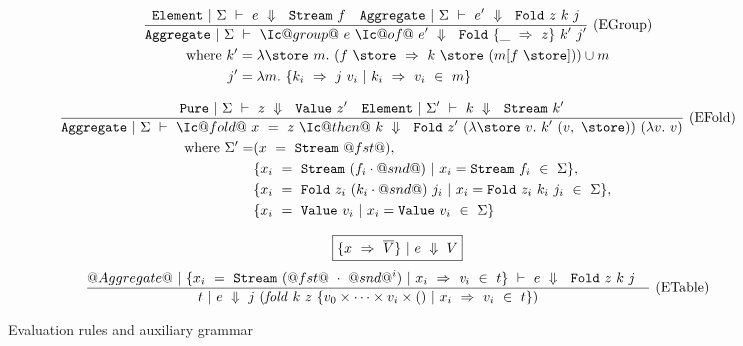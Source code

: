 \begin{figure*}
\begin{gather*}
\ruleIN
{
  \SourceStepXE{\Sigma}{e}{\VStream{f}}
  \quad
  \SourceStepXA{\Sigma}{e'}{\VFold{z}{k}{j}}
}
{
  \SourceStepXA{\Sigma}
    {\Ic@group@~e~\Ic@of@~e'}
    {\VFold
      {\{\_~\Rightarrow~z\}}
      {k'}
      {j'}}
}{EGroup}
\\
\begin{aligned}
\mbox{where }
k' & = \lam{\store~m}
(f~\store~\Rightarrow~k~\store~(m[f~\store])) \cup m
\\
j' & = \lam{m}
        \{k_i~\Rightarrow~j~v_i~|~k_i~\Rightarrow~v_i~\in~m\}
\end{aligned}
\end{gather*}

\begin{gather*}
\ruleIN
{
  \SourceStepXP{\Sigma}{z}{\VValue{z'}}
  \quad
  \SourceStepXE{\Sigma'}{k}{\VStream{k'}}
}
{
  \SourceStepXA{\Sigma}
    {\Ic@fold@~x~=~z~\Ic@then@~k}
    {\VFold
      {z'}
      {(\lam{\store~v} k'~(v,~\store))}
      {(\lam{v} v)}}
}{EFold}
 \\
\begin{aligned}
  \mbox{where } \Sigma' = &
    (x~=~\VStream{@fst@}),
\\ & \{x_i~=~\VStream{(f_i \cdot @snd@)}~|~x_i=\VStream{f_i}~\in~\Sigma\},
\\ & \{x_i~=~\VFold{z_i}{(k_i \cdot @snd@)}{j_i}~|~x_i=\VFold{z_i}{k_i}{j_i}~\in~\Sigma\},
\\ & \{x_i~=~\VValue{v_i}~|~x_i=\VValue{v_i}~\in~\Sigma\}
\end{aligned}
\end{gather*}

$$
\boxed{\{x~\Rightarrow~\overline{V}\}~|~e~\Downarrow~V}
$$
$$
\enskip \frac {\displaystyle 
  @Aggregate@~|~\{x_i~=~\texttt{Stream}~(@fst@~\cdot~@snd@^i)~|~x_i~\Rightarrow~\mathit{v}_i~\in~t\}~\vdash~e~\Downarrow~~\texttt{Fold}~z~k~j
  \quad
} {\displaystyle 
  t~|~e~\Downarrow~
  j~(\mathit{fold}~k~z~\{v_0 \times \cdots \times v_i \times ()~|~x_i~\Rightarrow~v_i~\in~t\})
} \  \mbox{(ETable)} \enskip
$$

\caption{Evaluation rules and auxiliary grammar}
\label{icicle:fig:source:eval}
\end{figure*}


